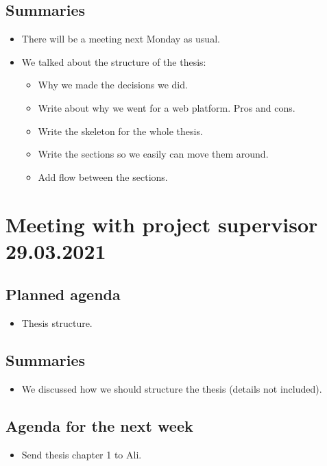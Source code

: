 \subsection*{Summaries}
\begin{itemize}
    \item There will be a meeting next Monday as usual.
    \item We talked about the structure of the thesis:
    \begin{itemize}
        \item Why we made the decisions we did.
        \item Write about why we went for a web platform. Pros and cons.
        \item Write the skeleton for the whole thesis.
        \item Write the sections so we easily can move them around.
        \item Add flow between the sections.
    \end{itemize}
\end{itemize}



\section*{Meeting with project supervisor 29.03.2021}
\subsection*{Planned agenda}
\begin{itemize}
    \item Thesis structure.
\end{itemize}

\subsection*{Summaries}
\begin{itemize}
    \item We discussed how we should structure the thesis (details not included).
\end{itemize}

\subsection*{Agenda for the next week}
\begin{itemize}
    \item Send thesis chapter 1 to Ali.
\end{itemize}



